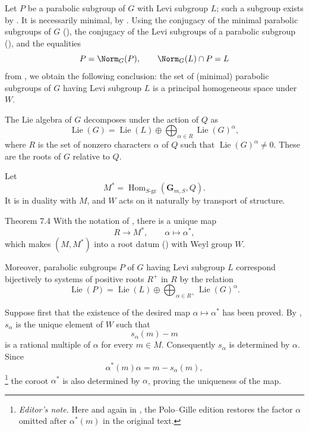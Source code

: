 Let \(P\) be a parabolic subgroup of \(G\) with Levi subgroup \(L\);
such a subgroup exists by .  It is necessarily minimal, by .
Using the conjugacy of the minimal parabolic subgroups of \(G\)
\textup{()}, the conjugacy of the Levi subgroups of a parabolic
subgroup \textup{()}, and the equalities
\[
 P=\Norm_G(P),\qquad \Norm_G(L)\cap P=L
\]
from , we obtain the following conclusion: the set of
\textup{(minimal)} parabolic subgroups of \(G\) having Levi subgroup
\(L\) is a principal homogeneous space under \(W\).


The Lie algebra of \(G\) decomposes under the action of \(Q\) as
\[
 \operatorname{Lie}(G)
 =\operatorname{Lie}(L)
  \oplus\bigoplus_{\alpha\in R}\operatorname{Lie}(G)^\alpha,
\]
where \(R\) is the set of nonzero characters \(\alpha\) of \(Q\)
such that \(\operatorname{Lie}(G)^\alpha\ne0\).  These are the roots
of \(G\) relative to \(Q\).

Let
\[
 M^*=\operatorname{Hom}_{S\text{-}\mathrm{gr}}
       (\mathbf G_{m,S},Q).
\]
It is in duality with \(M\), and \(W\) acts on it naturally by
transport of structure.

\begin{sgastatement}{Theorem 7.4}
With the notation of , there is a unique map
\[
 R\longrightarrow M^*,\qquad \alpha\longmapsto\alpha^*,
\]
which makes \((M,M^*)\) into a root datum \textup{()} with Weyl group \(W\).

Moreover, parabolic subgroups \(P\) of \(G\) having Levi subgroup
\(L\) correspond bijectively to systems of positive roots \(R^+\)
in \(R\) by the relation
\[
 \operatorname{Lie}(P)
 =\operatorname{Lie}(L)
  \oplus\bigoplus_{\alpha\in R^+}\operatorname{Lie}(G)^\alpha.
\]
\end{sgastatement}


Suppose first that the existence of the desired map
\(\alpha\mapsto\alpha^*\) has been proved.  By ,
\(s_\alpha\) is the unique element of \(W\) such that
\[
 s_\alpha(m)-m
\]
is a rational multiple of \(\alpha\) for every \(m\in M\).
Consequently \(s_\alpha\) is determined by \(\alpha\).  Since
\[
 \alpha^*(m)\alpha=m-s_\alpha(m),
\]
\footnote{\emph{Editor's note.} Here and again in , the
Polo--Gille edition restores the factor \(\alpha\) omitted after
\(\alpha^*(m)\) in the original text.}
the coroot \(\alpha^*\) is also determined by \(\alpha\), proving
the uniqueness of the map.

